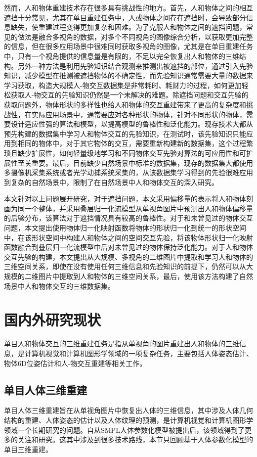 然而，人和物体重建技术存在很多具有挑战性的地方。首先，人和物体之间的相互遮挡十分常见，尤其在单目重建任务中，人或物体之间存在遮挡时，会导致部分信息缺失，使重建过程变得更加复杂和困难。为了克服人和物体之间的遮挡问题，常见的做法是融合多视角的数据，对多个不同视角的图像综合分析，以获取更加完整的信息，但在很多应用场景中很难同时获取多视角的图像，尤其是在单目重建任务中，只有一个视角提供的信息量是有限的，不足以完全恢复出人和物体的三维结构。另外一种方法是利用先验知识结合观测来推测出被遮挡的部位，通过引入先验知识，减少模型在推测被遮挡物体的不确定性，而先验知识通常需要大量的数据来学习获取，构造大规模人-物交互数据集是非常耗时、耗财力的过程，如何更加轻松获取人-物交互的先验知识仍然是一个未解决的难题。除遮挡问题和交互先验的获取问题外，物体形状的多样性也给人和物体的交互重建带来了更高的复杂度和挑战性，在实际应用场景中，通常要应对各种形状的物体，针对不同形状的物体，需要设计适应性强的算法和模型，以提高模型的鲁棒性和泛化能力。现存技术大都从预先构建的数据集中学习人和物体交互的先验知识，在测试时，该先验知识只能应用到相同的物体中，对于其它物体的交互，需要重新构建新的数据集，这个过程繁琐且缺少扩展性，如何轻量级地学习和不同物体交互先验对算法的可应用性和可扩展性至关重要。最后，目前缺少自然场景中标准的数据集，现存的数据集大都使用多摄像机采集系统或者光学动捕系统采集的，从该数据集学习得到的先验很难应用到复杂的自然场景中，限制了在自然场景中人和物体交互的深入研究。

本文针对以上问题展开研究，对于遮挡问题，本文采用偏移量的表示将人和物体刻画为同一个整体，并采用叠层归一化流模型从单视角图片中预测出人和物体偏移量的后验分布，该算法对于遮挡情况具有较高的鲁棒性。对于和未曾见过的物体交互问题，本文提出使用物体归一化映射函数将物体的形状归一化到统一的形状空间中，在该形状空间中构建人和物体之间的空间交互先验，将该物体形状归一化映射函数融合到叠层归一化流模型中后对未曾见过的物体保持泛化能力。对于人和物体交互先验的构建，本文提出从大规模、多视角的二维图片中提取和学习人和物体的三维空间关系，即使在没有使用任何三维信息和先验知识的前提下，仍然可以从大规模的二维图片中提取到人和物体的三维空间关系，最后，使用该方法构建了自然场景中人和物体交互的三维数据集。

\section{国内外研究现状}
单目人和物体交互的三维重建任务是指从单视角的图片重建出人和物体的三维信息，是计算机视觉和计算机图形学领域的一项复杂任务，主要包括人体姿态估计、物体6D位姿估计和人-物交互重建等相关工作。

\subsection{单目人体三维重建}
单目人体三维重建旨在从单视角图片中恢复出人体的三维信息，其中涉及人体几何结构的重建、人体姿态的估计以及人体纹理的预测，是计算机视觉和计算机图形学领域一个长期研究的问题。自从SMPL人体参数化模型\citep{SMPL}被提出后，该领域得到了更多的关注和研究。这其中涉及到很多技术路线，本节只回顾基于人体参数化模型的单目三维重建。

